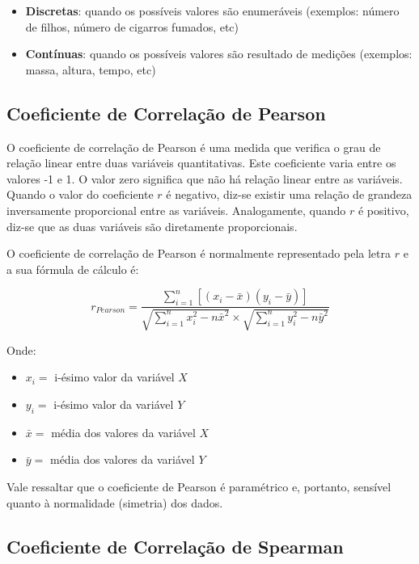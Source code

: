 \documentclass[
  portuguese,
]{estat/estat}
\providecommand{\tightlist}{%
  \setlength{\itemsep}{0pt}\setlength{\parskip}{0pt}}
\begin{document}
\begin{itemize}
\tightlist
\item
  \textbf{Discretas}: quando os possíveis valores são enumeráveis
  (exemplos: número de filhos, número de cigarros fumados, etc)
\item
  \textbf{Contínuas}: quando os possíveis valores são resultado de
  medições (exemplos: massa, altura, tempo, etc)
\end{itemize}

\subsection{Coeficiente de Correlação de
Pearson}\label{coeficiente-de-correlauxe7uxe3o-de-pearson}

O coeficiente de correlação de Pearson é uma medida que verifica o grau
de relação linear entre duas variáveis quantitativas. Este coeficiente
varia entre os valores -1 e 1. O valor zero significa que não há relação
linear entre as variáveis. Quando o valor do coeficiente \(r\) é
negativo, diz-se existir uma relação de grandeza inversamente
proporcional entre as variáveis. Analogamente, quando \(r\) é positivo,
diz-se que as duas variáveis são diretamente proporcionais.

O coeficiente de correlação de Pearson é normalmente representado pela
letra \(r\) e a sua fórmula de cálculo é:

\[
r_{Pearson} = \frac{\displaystyle \sum_{i=1}^{n} \left [ \left(x_i-\bar{x}\right) \left(y_i-\bar{y}\right) \right]}{\sqrt{\displaystyle \sum_{i=1}^{n} x_i^2 - n\bar{x}^2}  \times \sqrt{\displaystyle \sum_{i=1}^{n} y_i^2 - n\bar{y}^2}}
\]

Onde:

\begin{itemize}
\tightlist
\item
  \(x_i =\) i-ésimo valor da variável \(X\)
\item
  \(y_i =\) i-ésimo valor da variável \(Y\)
\item
  \(\bar{x} =\) média dos valores da variável \(X\)
\item
  \(\bar{y} =\) média dos valores da variável \(Y\)
\end{itemize}

Vale ressaltar que o coeficiente de Pearson é paramétrico e, portanto,
sensível quanto à normalidade (simetria) dos dados.

\subsection{Coeficiente de Correlação de
Spearman}\label{coeficiente-de-correlauxe7uxe3o-de-spearman}
\end{document}
